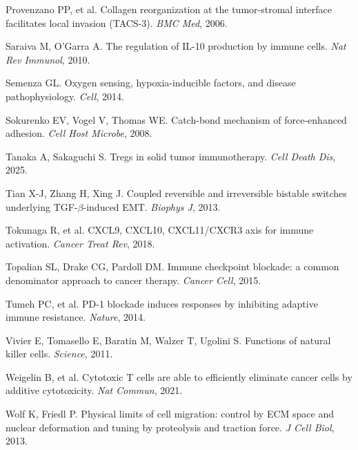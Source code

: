 \documentclass[11pt,letterpaper]{article}
\begin{document}
\begin{enumerate}[label={[\arabic*]}, leftmargin=*, itemsep=0pt]
  \item Provenzano PP, et al. Collagen reorganization at the
        tumor-stromal interface facilitates local invasion (TACS-3).
        \emph{BMC Med}, 2006.
  \item Saraiva M, O'Garra A. The regulation of IL-10 production by
        immune cells. \emph{Nat Rev Immunol}, 2010.
  \item Semenza GL. Oxygen sensing, hypoxia-inducible factors, and
        disease pathophysiology. \emph{Cell}, 2014.
  \item Sokurenko EV, Vogel V, Thomas WE. Catch-bond mechanism of
        force-enhanced adhesion. \emph{Cell Host Microbe}, 2008.
  \item Tanaka A, Sakaguchi S. Tregs in solid tumor immunotherapy.
        \emph{Cell Death Dis}, 2025.
  \item Tian X-J, Zhang H, Xing J. Coupled reversible and irreversible
        bistable switches underlying TGF-$\beta$-induced EMT.
        \emph{Biophys J}, 2013.
  \item Tokunaga R, et al. CXCL9, CXCL10, CXCL11/CXCR3 axis for immune
        activation. \emph{Cancer Treat Rev}, 2018.
  \item Topalian SL, Drake CG, Pardoll DM. Immune checkpoint blockade:
        a common denominator approach to cancer therapy.
        \emph{Cancer Cell}, 2015.
  \item Tumeh PC, et al. PD-1 blockade induces responses by inhibiting
        adaptive immune resistance. \emph{Nature}, 2014.
  \item Vivier E, Tomasello E, Baratin M, Walzer T, Ugolini S.
        Functions of natural killer cells. \emph{Science}, 2011.
  \item Weigelin B, et al. Cytotoxic T cells are able to efficiently
        eliminate cancer cells by additive cytotoxicity.
        \emph{Nat Commun}, 2021.
  \item Wolf K, Friedl P. Physical limits of cell migration: control by
        ECM space and nuclear deformation and tuning by proteolysis and
        traction force. \emph{J Cell Biol}, 2013.
\end{enumerate}
\end{document}
